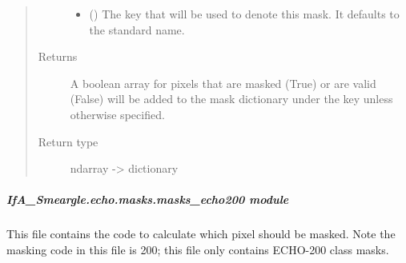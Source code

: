 \documentclass[letterpaper,10pt,english]{sphinxmanual}
\begin{document}
\begin{fulllineitems}
\begin{quote}
\begin{description}
\begin{itemize}
\item {} 
 (\sphinxstyleliteralemphasis{\sphinxupquote{ (}}\sphinxstyleliteralemphasis{\sphinxupquote{)}}) \textendash{} The key that will be used to denote this mask. It defaults to the
standard name.

\end{itemize}

\item[{Returns}] \leavevmode
{} \textendash{} A boolean array for pixels that are masked (True) or are valid
(False) will be added to the mask dictionary under the
key  unless otherwise specified.

\item[{Return type}] \leavevmode
ndarray -\textgreater{} dictionary

\end{description}\end{quote}

\end{fulllineitems}



\subparagraph{IfA\_Smeargle.echo.masks.masks\_echo200 module}
\label{\detokenize{python_docstrings/IfA_Smeargle.echo.masks.masks_echo200:module-IfA_Smeargle.echo.masks.masks_echo200}}\label{\detokenize{python_docstrings/IfA_Smeargle.echo.masks.masks_echo200:ifa-smeargle-echo-masks-masks-echo200-module}}\label{\detokenize{python_docstrings/IfA_Smeargle.echo.masks.masks_echo200::doc}}
This file contains the code to calculate which pixel should be masked. Note the masking code
in this file is 200; this file only contains ECHO-200 class masks.
\end{document}
